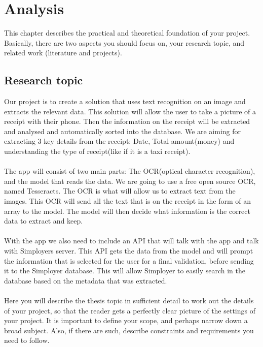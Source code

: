 \cleardoublepage
\chapter{Analysis}
\label{ch:analysis}

This chapter describes the practical and theoretical foundation of your project.
Basically, there are two aspects you should focus on, your research topic, and related work (literature and projects).

\section{Research topic}\label{sec:research-topic}

Our project is to create a solution that uses text recognition on an image and extracts the relevant data.
This solution will allow the user to take a picture of a receipt with their phone.
Then the information on the receipt will be extracted and analysed and automatically sorted into the database.
We are aiming for extracting 3 key details from the receipt: Date, Total amount(money) and understanding the type of receipt(like if it is a taxi receipt).\\
\\
The app will consist of two main parts: The OCR(optical character recognition), and the model that reads the data.
We are going to use a free open source OCR, named Tesseracts.
The OCR is what will allow us to extract text from the images.
This OCR will send all the text that is on the receipt in the form of an array to the model.
The model will then decide what information is the correct data to extract and keep.\\
\\
With the app we also need to include an API that will talk with the app and talk with Simployers server.
This API gets the data from the model and will prompt the information that is selected for the user for a final
validation, before sending it to the Simployer database.
This will allow Simployer to easily search in the database based on the metadata that was extracted.\\
\\
Here you will describe the thesis topic in sufficient detail to work out the details of your project, so that the reader gets a perfectly clear picture of the settings of your project.
It is important to define your scope, and perhaps narrow down a broad subject.
Also, if there are such, describe constraints and requirements you need to follow.

